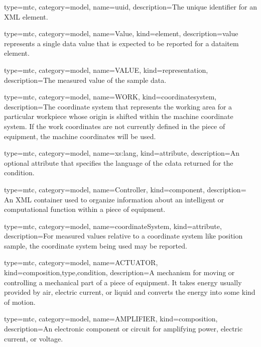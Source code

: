 {
  type=mtc,
  category=model,
  name={uuid},
  description={The unique identifier for an XML element.}
}



{
  type=mtc,
  category=model,
  name={Value},
  kind={element},
  description={\gls{value} represents a single data value that is expected to be reported for a \gls{dataitem} element. }
}


{
  type=mtc,
  category=model,
  name={VALUE},
  kind={representation},
  description={The measured value of the sample data.}
}


{
  type=mtc,
  category=model,
  name={WORK},
  kind={coordinatesystem},
  description={The coordinate system that represents the working area for a particular workpiece whose origin is shifted within the \gls{machine} coordinate system. If the \gls{work} coordinates are not currently defined in the piece of equipment, the \gls{machine} coordinates will be used.}
}


{
  type=mtc,
  category=model,
  name={xs:lang},
  kind={attribute},
  description={An optional attribute that specifies the language of the \gls{cdata} returned for the \gls{condition}.}
}


{
  type=mtc,
  category=model,
  name={Controller},
  kind={component},
  description= {An XML container used to organize information about an intelligent or computational function within a piece of equipment.}
}


{
  type=mtc,
  category=model,
  name={coordinateSystem},
  kind={attribute},
  description={For measured values relative to a coordinate system like \gls{position sample}, the coordinate system being used may be reported.}
}


{
  type=mtc,
  category=model,
  name={ACTUATOR},
  kind={composition,type,condition},
  description={A mechanism for moving or controlling a mechanical part of a piece of equipment.   \newline It takes energy usually provided by air, electric current, or liquid and converts the energy into some kind of motion. }
}


{
  type=mtc,
  category=model,
  name={AMPLIFIER},
  kind={composition},
  description={An electronic component or circuit for amplifying power, electric current, or voltage.}
}


